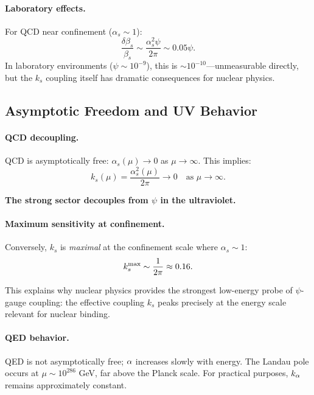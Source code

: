 \paragraph{Laboratory effects.}
For QCD near confinement ($\alpha_s \sim 1$):
\begin{equation}
\frac{\delta\beta_s}{\beta_s} \sim \frac{\alpha_s^2\psi}{2\pi} \sim 0.05\psi.
\end{equation}
In laboratory environments ($\psi \sim 10^{-9}$), this is $\sim 10^{-10}$---unmeasurable directly, but the $k_s$ coupling itself has dramatic consequences for nuclear physics.

\subsection{Asymptotic Freedom and UV Behavior}\label{sec:gauge-asymptotic}

\paragraph{QCD decoupling.}
QCD is asymptotically free: $\alpha_s(\mu) \to 0$ as $\mu \to \infty$. This implies:
\begin{equation}
k_s(\mu) = \frac{\alpha_s^2(\mu)}{2\pi} \to 0 \quad \text{as } \mu \to \infty.
\end{equation}

\textbf{The strong sector decouples from $\psi$ in the ultraviolet.}

\paragraph{Maximum sensitivity at confinement.}
Conversely, $k_s$ is \textit{maximal} at the confinement scale where $\alpha_s \sim 1$:
\begin{equation}
k_s^{\rm max} \sim \frac{1}{2\pi} \approx 0.16.
\end{equation}

This explains why nuclear physics provides the strongest low-energy probe of $\psi$-gauge coupling: the effective coupling $k_s$ peaks precisely at the energy scale relevant for nuclear binding.

\paragraph{QED behavior.}
QED is not asymptotically free; $\alpha$ increases slowly with energy. The Landau pole occurs at $\mu \sim 10^{286}$ GeV, far above the Planck scale. For practical purposes, $k_\alpha$ remains approximately constant.

